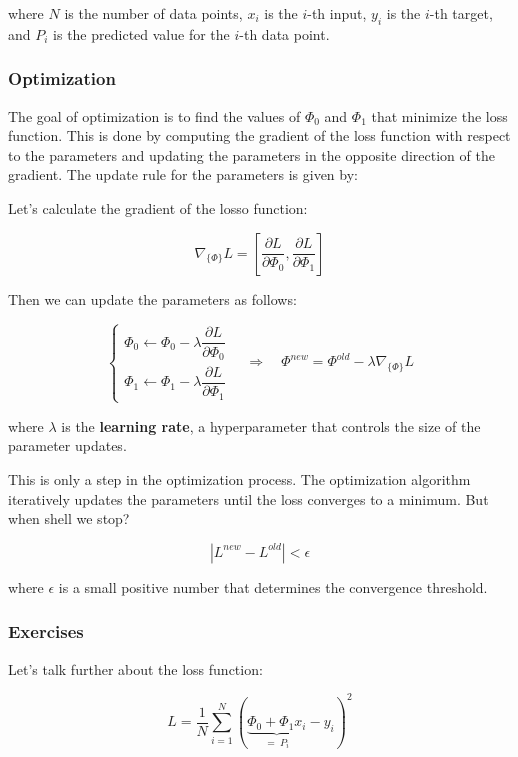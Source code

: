 where $N$ is the number of data points, $x_i$ is the $i$-th input, $y_i$ is the $i$-th target, and $P_i$ is the predicted value for the $i$-th data point.

\subsubsection{Optimization}

The goal of optimization is to find the values of $\Phi_0$ and $\Phi_1$ that minimize the loss function. This is done by computing the gradient of the loss function with respect to the parameters and updating the parameters in the opposite direction of the gradient. The update rule for the parameters is given by:

Let's calculate the gradient of the losso function:

$$
\nabla_{\{\Phi\}} L = \left[ \dfrac{\partial L}{\partial \Phi_0}, \dfrac{\partial L}{\partial \Phi_1} \right]
$$

Then we can update the parameters as follows:

$$
\begin{cases}
\Phi_0 \leftarrow \Phi_0 - \lambda \dfrac{\partial L}{\partial \Phi_0}\\
\Phi_1 \leftarrow \Phi_1 - \lambda \dfrac{\partial L}{\partial \Phi_1}
\end{cases}
\quad \Rightarrow \quad
\Phi^{new} = \Phi^{old} - \lambda \nabla_{\{\Phi\}} L
$$

where $\lambda$ is the \textbf{learning rate}, a hyperparameter that controls the size of the parameter updates.

This is only a step in the optimization process. The optimization algorithm iteratively updates the parameters until the loss converges to a minimum.
But when shell we stop?

$$
|L^{new} - L^{old}| < \epsilon
$$

where $\epsilon$ is a small positive number that determines the convergence threshold.

\newpage

\subsubsection{Exercises}

Let's talk further about the loss function:

$$
L = \dfrac 1N \sum_{i=1}^{N} (\underbrace{\Phi_0 + \Phi_1 x_i}_{= \ P_i} - y_i)^2
$$

